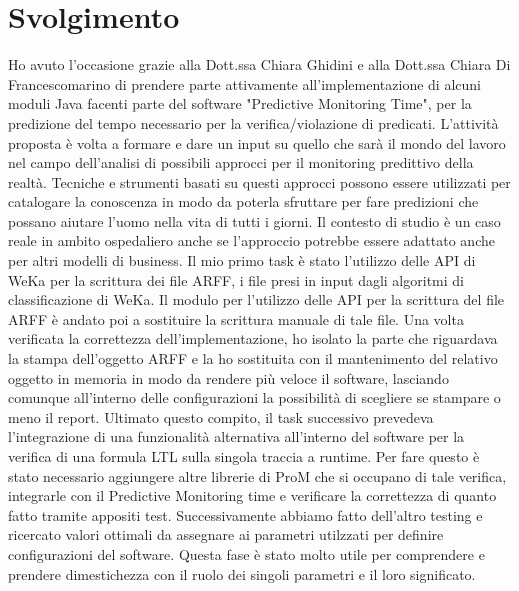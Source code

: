 \documentclass[11pt]{article} %
\begin{document}
\section{Svolgimento}
Ho avuto l'occasione grazie alla Dott.ssa Chiara Ghidini e alla Dott.ssa Chiara Di Francescomarino di prendere parte attivamente all'implementazione di alcuni moduli Java facenti parte del software "Predictive Monitoring Time", per la predizione del tempo necessario per la verifica/violazione di predicati.
L'attività proposta è volta a formare e dare un input su quello che sarà il mondo del lavoro nel campo dell'analisi di possibili approcci per il monitoring predittivo della realtà. Tecniche e strumenti basati su questi approcci possono essere utilizzati per catalogare la conoscenza  in modo da poterla sfruttare per fare predizioni che possano aiutare l'uomo nella vita di tutti i giorni.
Il contesto di studio è un caso reale in ambito ospedaliero anche se l'approccio potrebbe essere adattato anche per altri modelli di business.
Il mio primo task è stato l'utilizzo delle API di WeKa per la scrittura dei file ARFF, i file presi in input dagli algoritmi di classificazione di WeKa. Il  modulo per l'utilizzo delle API per la scrittura del file ARFF è andato poi a sostituire la scrittura manuale di tale file.
Una volta verificata la correttezza dell'implementazione, ho isolato la parte che riguardava la stampa dell'oggetto ARFF e la ho sostituita con il mantenimento del relativo oggetto in memoria in modo da rendere più veloce il software, lasciando comunque all'interno delle configurazioni la possibilità di scegliere se stampare o meno il report.
Ultimato questo compito, il task successivo prevedeva l'integrazione di una funzionalità alternativa all'interno del software per la verifica di una formula LTL sulla singola traccia a runtime. Per fare questo è stato necessario aggiungere altre librerie di ProM che si occupano di tale verifica, integrarle con il Predictive Monitoring time e verificare la correttezza di quanto fatto tramite appositi test. Successivamente abbiamo fatto dell'altro testing e ricercato valori ottimali da assegnare ai parametri utilzzati per definire configurazioni del software. Questa fase è stato molto utile per comprendere e prendere dimestichezza con il ruolo dei singoli parametri e il loro significato.
\end{document}
